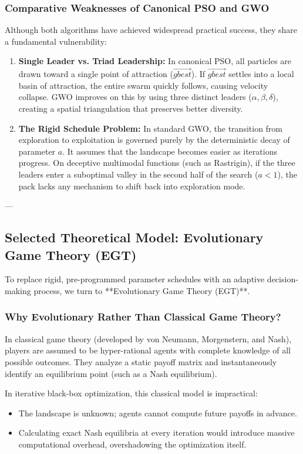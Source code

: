 \subsubsection{Comparative Weaknesses of Canonical PSO and GWO}
Although both algorithms have achieved widespread practical success, they share a fundamental vulnerability:
\begin{enumerate}
    \item \textbf{Single Leader vs. Triad Leadership:} In canonical PSO, all particles are drawn toward a single point of attraction ($\vec{gbest}$). If $\vec{gbest}$ settles into a local basin of attraction, the entire swarm quickly follows, causing velocity collapse. GWO improves on this by using three distinct leaders ($\alpha, \beta, \delta$), creating a spatial triangulation that preserves better diversity.
    \item \textbf{The Rigid Schedule Problem:} In standard GWO, the transition from exploration to exploitation is governed purely by the deterministic decay of parameter $a$. It assumes that the landscape becomes easier as iterations progress. On deceptive multimodal functions (such as Rastrigin), if the three leaders enter a suboptimal valley in the second half of the search ($a < 1$), the pack lacks any mechanism to shift back into exploration mode.
\end{enumerate}

---

\subsection{Selected Theoretical Model: Evolutionary Game Theory (EGT)}

To replace rigid, pre-programmed parameter schedules with an adaptive decision-making process, we turn to **Evolutionary Game Theory (EGT)**.

\subsubsection{Why Evolutionary Rather Than Classical Game Theory?}
In classical game theory (developed by von Neumann, Morgenstern, and Nash), players are assumed to be hyper-rational agents with complete knowledge of all possible outcomes. They analyze a static payoff matrix and instantaneously identify an equilibrium point (such as a Nash equilibrium).

In iterative black-box optimization, this classical model is impractical:
\begin{itemize}
    \item The landscape is unknown; agents cannot compute future payoffs in advance.
    \item Calculating exact Nash equilibria at every iteration would introduce massive computational overhead, overshadowing the optimization itself.
\end{itemize}


